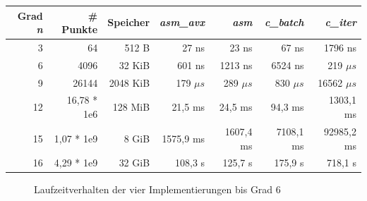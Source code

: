 \documentclass[course=erap]{aspdoc}
\begin{document}
\begin{center}
    \begin{tabular}{| r | r | r | r | r | r | r |}
    \hline
    Grad \textit{n} & \# Punkte & Speicher & \textit{asm\_avx} & \textit{asm} & \textit{c\_batch} & \textit{c\_iter}  \\ \hline
    3 & 64 & 512 B  & 27 ns & 23 ns & 67 ns & 1796 ns \\  \hline
    6 & 4096 & 32 KiB  & 601 ns & 1213 ns & 6524 ns & 219 $\mu s$ \\  \hline
    9 & 26144 & 2048 KiB  & 179 $\mu s$ & 289 $\mu s$ & 830 $\mu s$ & 16562 $\mu s$  \\  \hline
    12 & 16,78 * 1e6 & 128 MiB & 21,5 ms & 24,5 ms & 94,3 ms & 1303,1 ms \\ \hline
    15 & 1,07 * 1e9 & 8 GiB & 1575,9 ms & 1607,4 ms & 7108,1 ms & 92985,2 ms \\ \hline
    16 & 4,29 * 1e9 & 32 GiB & 108,3 s & 125,7 s & 175,9 s & 718,1 s \\ \hline
    \end{tabular}
\end{center}

\begin{figure}[htbp] 
    \centering
    \qquad
    \caption{Laufzeitverhalten der vier Implementierungen bis Grad 6}%
    \label{fig:Laufzeitvergleich}%
 \end{figure}
 
\end{document}

